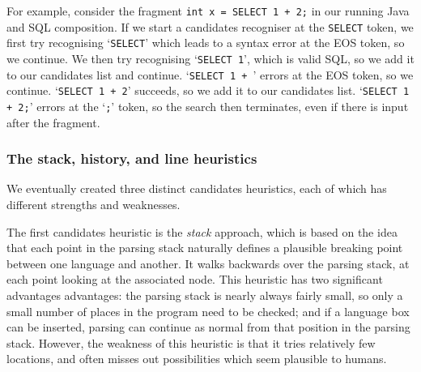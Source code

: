 \documentclass[sigplan,screen]{acmart}\settopmatter{printfolios=true,printccs=false,printacmref=false}
\begin{document}
For example, consider the fragment \texttt{int x = SELECT 1 + 2;} in our
running Java and SQL composition. If we start a candidates recogniser at the
\texttt{SELECT} token, we first try recognising `\texttt{SELECT}' which leads
to a syntax error at the EOS token, so we continue. We then try recognising
`\texttt{SELECT 1}', which is valid SQL, so we add it to our candidates list
and continue. `\texttt{SELECT 1 + }' errors at the EOS token, so we continue.
`\texttt{SELECT 1 + 2}' succeeds, so we add it to our candidates list.
`\texttt{SELECT 1 + 2;}' errors at the `\texttt{;}' token, so the search then
terminates, even if there is input after the fragment.


\subsubsection{The stack, history, and line heuristics}

We eventually created three distinct candidates heuristics, each of which has
different strengths and weaknesses.

The first candidates heuristic is the \emph{stack} approach, which is based on
the idea that each point in the parsing stack naturally defines a plausible
breaking point between one language and another. It walks backwards over the
parsing stack, at each point looking at the associated node. This heuristic has
two significant advantages
advantages: the parsing stack is nearly always fairly small, so only a small number
of places in the program need to be checked; and if a language box can be
inserted, parsing can continue as normal from that position in the parsing
stack. However, the weakness of this heuristic is that it tries relatively few
locations, and often misses out possibilities which seem plausible to humans.
\end{document}
